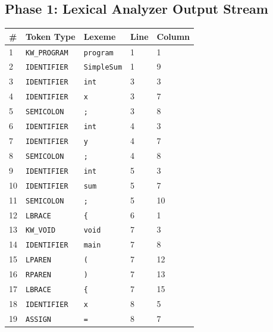 \documentclass[11pt,a4paper]{article}
\newcommand{\theadcell}[1]{\textbf{\color{white}#1}}
\begin{document}
\subsection{Phase 1: Lexical Analyzer Output Stream}

\begin{center}
\begin{tabular}{|C{0.5cm}|L{4.2cm}|L{3.8cm}|C{1.4cm}|C{1.5cm}|}
\hline
{}
\theadcell{\#} & \theadcell{Token Type} & \theadcell{Lexeme} & \theadcell{Line} & \theadcell{Column} \\
  & \texttt{KW\_PROGRAM}  & \texttt{program}   & 1  & 1  \\
2  & \texttt{IDENTIFIER}   & \texttt{SimpleSum}  & 1  & 9  \\
3  & \texttt{IDENTIFIER}   & \texttt{int}        & 3  & 3  \\
4  & \texttt{IDENTIFIER}   & \texttt{x}          & 3  & 7  \\
5  & \texttt{SEMICOLON}    & \texttt{;}          & 3  & 8  \\
6  & \texttt{IDENTIFIER}   & \texttt{int}        & 4  & 3  \\
7  & \texttt{IDENTIFIER}   & \texttt{y}          & 4  & 7  \\
8  & \texttt{SEMICOLON}    & \texttt{;}          & 4  & 8  \\
9  & \texttt{IDENTIFIER}   & \texttt{int}        & 5  & 3  \\
10 & \texttt{IDENTIFIER}   & \texttt{sum}        & 5  & 7  \\
11 & \texttt{SEMICOLON}    & \texttt{;}          & 5  & 10 \\
12 & \texttt{LBRACE}       & \texttt{\{}         & 6  & 1  \\
13 & \texttt{KW\_VOID}     & \texttt{void}       & 7  & 3  \\
14 & \texttt{IDENTIFIER}   & \texttt{main}       & 7  & 8  \\
15 & \texttt{LPAREN}       & \texttt{(}          & 7  & 12 \\
16 & \texttt{RPAREN}       & \texttt{)}          & 7  & 13 \\
17 & \texttt{LBRACE}       & \texttt{\{}         & 7  & 15 \\
18 & \texttt{IDENTIFIER}   & \texttt{x}          & 8  & 5  \\
19 & \texttt{ASSIGN}       & \texttt{=}          & 8  & 7  \\

\end{tabular}
\end{center}
\end{document}
